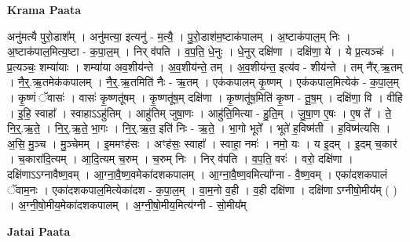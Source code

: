 \documentclass[17pt]{extarticle}
\begin{document}
\textbf{Krama Paata} \newline

अनु॑मत्यै पुरो॒डाश᳚म् । अनु॑मत्या॒ इत्यनु॑ - म॒त्यै॒ । पु॒रो॒डाश॑म॒ष्टाक॑पालम् । अ॒ष्टाक॑पाल॒म् निः । अ॒ष्टाक॑पाल॒मित्य॒ष्टा - क॒पा॒ल॒म् । निर् व॑पति । व॒प॒ति॒ धे॒नुः । धे॒नुर् दक्षि॑णा । दक्षि॑णा॒ ये । ये प्र॒त्यञ्चः॑ । प्र॒त्यञ्चः॒ शम्या॑याः । शम्या॑या अव॒शीय॑न्ते । अ॒व॒शीय॑न्ते॒ तम् । अ॒व॒शीय॑न्त॒ इत्य॑व - शीय॑न्ते । तम् नै॑र्.ऋ॒तम् । नै॒र्॒.ऋ॒तमेक॑कपालम् । नै॒र्॒.ऋ॒तमिति॑ नैः - ऋ॒तम् । एक॑कपालम् कृ॒ष्णम् । एक॑कपाल॒मित्येक॑ - क॒पा॒ल॒म् । कृ॒ष्णं ॅवासः॑ । वासः॑ कृ॒ष्णतू॑षम् । कृ॒ष्णतू॑ष॒म् दक्षि॑णा । कृ॒ष्णतू॑ष॒मिति॑ कृ॒ष्ण - तू॒ष॒म् । दक्षि॑णा॒ वि । वीहि॑ । इ॒हि॒ स्वाहा᳚ । स्वाहाऽऽहु॑तिम् । आहु॑तिम् जुषा॒णः । आहु॑ति॒मित्या - हु॒ति॒म् । जु॒षा॒ण ए॒षः । ए॒ष ते᳚ । ते॒ नि॒र्॒.ऋ॒ते॒ । नि॒र्॒.ऋ॒ते॒ भा॒गः । नि॒र्॒.ऋ॒त॒ इति॑ निः - ऋ॒ते॒ । भा॒गो भूते᳚ । भूते॑ ह॒विष्म॑ती । ह॒विष्म॑त्यसि । अ॒सि॒ मु॒ञ्च । मु॒ञ्चेमम् । इ॒ममꣳह॑सः । अꣳह॑सः॒ स्वाहा᳚ । स्वाहा॒ नमः॑ । नमो॒ यः । य इ॒दम् । इ॒दम् च॒कार॑ । च॒कारा॑दि॒त्यम् । आ॒दि॒त्यम् च॒रुम् । च॒रुम् निः । निर् व॑पति । व॒प॒ति॒ वरः॑ । वरो॒ दक्षि॑णा । दक्षि॑णाऽऽग्नावैष्ण॒वम् । आ॒ग्ना॒वै॒ष्ण॒वमेका॑दशकपालम् । आ॒ग्ना॒वै॒ष्ण॒वमित्या᳚ग्ना - वै॒ष्ण॒वम् । एका॑दशकपालं ॅवाम॒नः । एका॑दशकपाल॒मित्येका॑दश - क॒पा॒ल॒म् । वा॒म॒नो व॒ही । 
व॒ही दक्षि॑णा । दक्षि॑णा ऽग्नीषो॒मीय᳚म् ( ) । अ॒ग्नी॒षो॒मीय॒मेका॑दशकपालम् । अ॒ग्नी॒षो॒मीय॒मित्य॑ग्नी - सो॒मीय᳚म् \newline

\textbf{Jatai Paata} \newline
\end{document}
